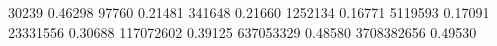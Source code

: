 30239       0.46298
97760       0.21481
341648      0.21660
1252134     0.16771
5119593     0.17091
23331556    0.30688
117072602   0.39125
637053329   0.48580
3708382656  0.49530